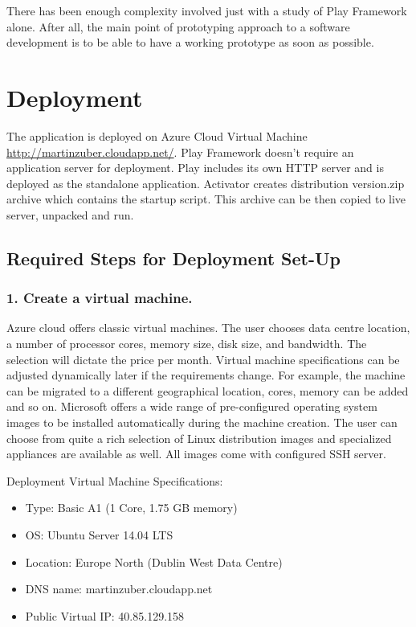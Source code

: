 \documentclass[12pt,twoside,a4paper]{report}
\begin{document}
There has been enough complexity involved just with a study of Play Framework alone. After all, the main point of prototyping approach to a software development is to be able to have a working prototype as soon as possible.

\section{Deployment}\label{4.6}
The application is deployed on Azure Cloud Virtual Machine \url{http://martinzuber.cloudapp.net/}. Play Framework doesn't require an application server for deployment. Play includes its own HTTP server and is deployed as the standalone application. Activator creates distribution version.zip archive which contains the startup script. This archive can be then copied to live server, unpacked and run.

\subsection{Required Steps for Deployment Set-Up}\label{4.6.1}

\subsubsection{1. Create a virtual machine.}
Azure cloud offers classic virtual machines. The user chooses data centre location, a number of processor cores, memory size, disk size, and bandwidth. The selection will dictate the price per month. Virtual machine specifications can be adjusted dynamically later if the requirements change. For example, the machine can be migrated to a different geographical location, cores, memory can be added and so on. Microsoft offers a wide range of pre-configured operating system images to be installed automatically during the machine creation. The user can choose from quite a rich selection of Linux distribution images and specialized appliances are available as well. All images come with configured SSH server.

Deployment Virtual Machine Specifications:
\begin{itemize}\itemsep1pt \parskip0pt 
\item Type: Basic A1 (1 Core, 1.75 GB memory)
\item OS: Ubuntu Server 14.04 LTS
\item Location: Europe North (Dublin West Data Centre)
\item DNS name: martinzuber.cloudapp.net
\item Public Virtual IP: 40.85.129.158
\end{itemize}
\end{document}
